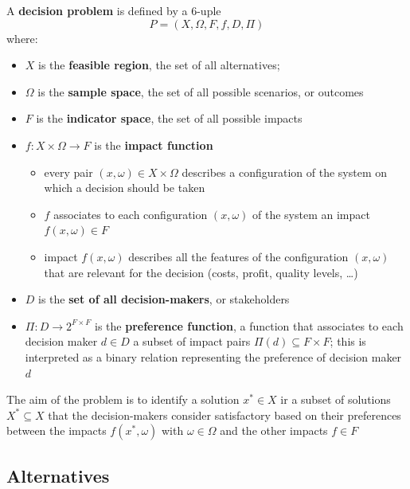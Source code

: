 \begin{definition}
	A \textbf{decision problem} is defined by a 6-uple
	$$ P = \left(X, \Omega, F, f, D, \Pi \right)$$
	where: 
	\begin{itemize}
		\item $X$ is the \textbf{feasible region}, the set of all alternatives; 
		
		\item $\Omega$ is the \textbf{sample space}, the set of all possible scenarios, or outcomes
		
		\item $F$ is the \textbf{indicator space}, the set of all possible impacts
		
		\item $f: X \times \Omega \rightarrow F$ is the \textbf{impact function}
		\begin{itemize}
			\item every pair $(x, \omega) \in X \times \Omega$ describes a configuration of the system on which a decision should be taken
			
			\item $f$ associates to each configuration $(x, \omega)$ of the system an impact $f(x, \omega) \in F$
			
			\item impact $f(x, \omega)$ describes all the features of the configuration $(x, \omega)$ that are relevant for the decision (costs, profit, quality levels, \dots)
		\end{itemize}
		
		\item $D$ is the \textbf{set of all decision-makers}, or stakeholders
		
		\item $\Pi: D \rightarrow 2^{F \times F}$ is the \textbf{preference function}, a function that associates to each decision maker $d \in D$ a subset of impact pairs $\Pi(d) \subseteq F \times F$; this is interpreted as a binary relation representing the preference of decision maker $d$
	\end{itemize}
\end{definition}

The aim of the problem is to identify a solution $x^\ast \in X$ ir a subset of solutions $X^\ast \subseteq X$ that the decision-makers consider satisfactory based on their preferences between the impacts $f(x^\ast, \omega)$ with $\omega \in \Omega$ and the other impacts $f \in F$

\subsection{Alternatives}
\label{subsec:alternativesdef}

